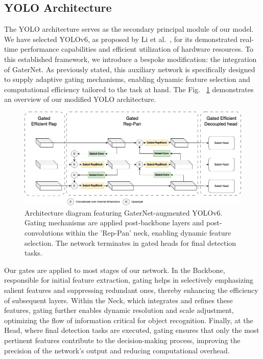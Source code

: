 \documentclass[runningheads]{llncs}
\begin{document}
\subsection{YOLO Architecture}

The YOLO architecture serves as the secondary principal module of our model. We have selected YOLOv6, as proposed by Li et al.~\cite{li2023yolov6,li2022yolov6}, for its demonstrated real-time performance capabilities and efficient utilization of hardware resources. To this established framework, we introduce a bespoke modification: the integration of GaterNet. As previously stated, this auxiliary network is specifically designed to supply adaptive gating mechanisms, enabling dynamic feature selection and computational efficiency tailored to the task at hand. The Fig. ~\ref{fig:yolo_architecture} demonstrates an overview of our modified YOLO architecture.

\begin{figure}[ht]
\centering
\includegraphics[width=\textwidth]{./Images/yolov6_architecture.png}
\caption{Architecture diagram featuring GaterNet-augmented YOLOv6. Gating mechanisms are applied post-backbone layers and post-convolutions within the 'Rep-Pan' neck, enabling dynamic feature selection. The network terminates in gated heads for final detection tasks.}
\label{fig:yolo_architecture}
\end{figure}

Our gates are applied to most stages of our network. In the Backbone, responsible for initial feature extraction, gating helps in selectively emphasizing salient features and suppressing redundant ones, thereby enhancing the efficiency of subsequent layers. Within the Neck, which integrates and refines these features, gating further enables dynamic resolution and scale adjustment, optimizing the flow of information critical for object recognition. Finally, at the Head, where final detection tasks are executed, gating ensures that only the most pertinent features contribute to the decision-making process, improving the precision of the network's output and reducing computational overhead.
\end{document}
